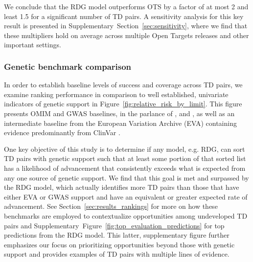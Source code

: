\documentclass{article}
\begin{document}
We conclude that the RDG model outperforms OTS by a factor of at most 2 and least 1.5 for a significant number of TD pairs. A sensitivity analysis for this key result is presented in Supplementary~Section~\ref{sec:sensitivity}, where we find that these multipliers hold on average across multiple Open Targets releases and other important settings.

\subsubsection{Genetic benchmark comparison}

In order to establish baseline levels of success and coverage across TD pairs, we examine ranking performance in comparison to well established, univariate indicators of genetic support in Figure~\ref{fig:relative_risk_by_limit}. This figure presents OMIM and GWAS baselines, in the parlance of \cite{King2019-rc}, \cite{Nelson2015-eg} and \cite{Minikel2023.06.23.23291765}, as well as an intermediate baseline from the European Variation Archive (EVA) \cite{PMID:34718739} containing evidence predominantly from ClinVar \cite{PMID:24234437}.

One key objective of this study is to determine if any model, e.g. RDG, can sort TD pairs with genetic support such that at least some portion of that sorted list has a likelihood of advancement that consistently exceeds what is expected from any one source of genetic support. We find that this goal is met and surpassed by the RDG model, which actually identifies more TD pairs than those that have either EVA or GWAS support and have an equivalent or greater expected rate of advancement. See Section~\ref{sec:results_rankings} for more on how these benchmarks are employed to contextualize opportunities among undeveloped TD pairs and Supplementary~Figure~\ref{fig:top_evaluation_predictions} for top predictions from the RDG model. This latter, supplementary figure further emphasizes our focus on prioritizing opportunities beyond those with genetic support and provides examples of TD pairs with multiple lines of evidence.
\end{document}
